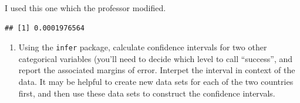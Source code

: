 \documentclass[
]{article}
\newenvironment{Shaded}{\begin{snugshade}}{\end{snugshade}}
\newcommand{\AttributeTok}[1]{\textcolor[rgb]{0.77,0.63,0.00}{#1}}
\newcommand{\ConstantTok}[1]{\textcolor[rgb]{0.00,0.00,0.00}{#1}}
\newcommand{\DecValTok}[1]{\textcolor[rgb]{0.00,0.00,0.81}{#1}}
\newcommand{\FloatTok}[1]{\textcolor[rgb]{0.00,0.00,0.81}{#1}}
\newcommand{\FunctionTok}[1]{\textcolor[rgb]{0.00,0.00,0.00}{#1}}
\newcommand{\NormalTok}[1]{#1}
\newcommand{\OtherTok}[1]{\textcolor[rgb]{0.56,0.35,0.01}{#1}}
\newcommand{\SpecialCharTok}[1]{\textcolor[rgb]{0.00,0.00,0.00}{#1}}
\newcommand{\StringTok}[1]{\textcolor[rgb]{0.31,0.60,0.02}{#1}}
\providecommand{\tightlist}{%
  \setlength{\itemsep}{0pt}\setlength{\parskip}{0pt}}
\begin{document}
\begin{Shaded}
\end{Shaded}

I used this one which the professor modified.

\begin{Shaded}
\end{Shaded}

\begin{verbatim}
## [1] 0.0001976564
\end{verbatim}

\begin{enumerate}
\def\labelenumi{\arabic{enumi}.}
\setcounter{enumi}{3}
\tightlist
\item
  Using the \texttt{infer} package, calculate confidence intervals for
  two other categorical variables (you'll need to decide which level to
  call ``success'', and report the associated margins of error. Interpet
  the interval in context of the data. It may be helpful to create new
  data sets for each of the two countries first, and then use these data
  sets to construct the confidence intervals.
\end{enumerate}
\end{document}
